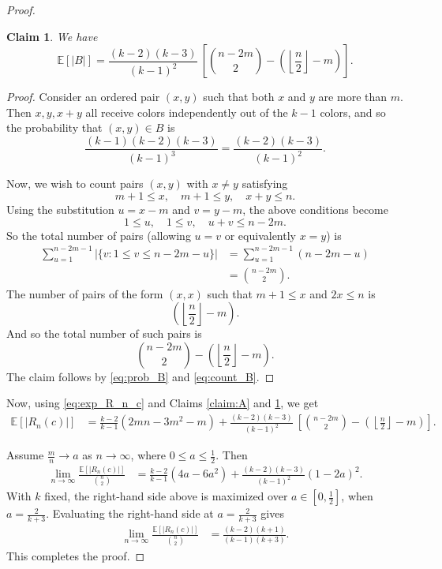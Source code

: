 \documentclass[11pt]{article}
\theoremstyle{plain}
\newtheorem{claim}{Claim}[section]
\numberwithin{equation}{section}
\begin{document}
\begin{proof}
\begin{claim}\label{claim:B} We have 
\[ \mathbb{E}[|B|] = \frac{(k-2)(k-3)}{(k-1)^2}\ \left[{n-2m\choose 2} - \left(\left\lfloor\frac{n}{2}\right\rfloor - m\right)\right].\]
\end{claim}

\begin{proof} Consider an ordered pair $(x,y)$ such that both $x$ and $y$ are more than $m$. Then $x,y,x+y$ all receive colors independently out of the $k-1$ colors, and so the probability that $(x,y)\in B$ is 
\begin{equation}\label{eq:prob_B}
     \frac{(k-1)(k-2)(k-3)}{(k-1)^3} = \frac{(k-2)(k-3)}{(k-1)^2}.
\end{equation}

Now, we wish to count pairs $(x,y)$ with $x\ne y$ satisfying 
\[ m+1\le x, \quad m+1\le y, \quad x+y\le n.\]
Using the substitution $u=x-m$ and $v=y-m$, the above conditions become 
\[ 1\le u, \quad 1\le v, \quad u+v\le n-2m.\]
So the total number of pairs (allowing $u=v$ or equivalently $x=y$) is 
\begin{align*}
\sum_{u=1}^{n-2m-1} |\{v: 1\le v\le n-2m-u\}|
& = \sum_{u=1}^{n-2m-1} (n-2m-u)\\
& = {n-2m \choose 2}. 
\end{align*}
The number of pairs of the form $(x,x)$ such that $m+1\le x$ and $2x\le n$ is \[\left(\left\lfloor\frac{n}{2}\right\rfloor - m\right).\] 
And so the total number of such pairs is
\begin{equation}\label{eq:count_B}
    {n-2m\choose 2} - \left(\left\lfloor\frac{n}{2}\right\rfloor - m\right).
\end{equation}
The claim follows by \eqref{eq:prob_B} and \eqref{eq:count_B}.
\end{proof}

Now, using \eqref{eq:exp_R_n_c} and Claims \ref{claim:A} and \ref{claim:B}, we get 
\begin{align*}
\mathbb{E}[|R_n(c)|] 
& = \frac{k-2}{k-1}\left(2mn - 3m^2 - m\right) + \frac{(k-2)(k-3)}{(k-1)^2}\ \left[{n-2m\choose 2} - \left(\left\lfloor\frac{n}{2}\right\rfloor - m\right)\right].
\end{align*}

Assume $\frac{m}{n}\to a$ as $n\to \infty$, where $0\le a\le\frac{1}{2}$. Then 
\begin{align*}
\lim_{n\to \infty}\frac{\mathbb{E}[|R_n(c)|]}{{n\choose 2}}
& = \frac{k-2}{k-1}\left(4a - 6a^2\right) + \frac{(k-2)(k-3)}{(k-1)^2}(1-2a)^2.
\end{align*}
With $k$ fixed, the right-hand side above is maximized over $a\in [0,\frac{1}{2}]$, when $a = \frac{2}{k+3}$. Evaluating the right-hand side at $a=\frac{2}{k+3}$ gives 
\begin{align*}
\lim_{n\to \infty}\frac{\mathbb{E}[|R_n(c)|]}{{n\choose 2}}
& = \frac{(k-2)(k+1)}{(k-1)(k+3)}.
\end{align*}
This completes the proof. 
\end{proof}
\end{document}
